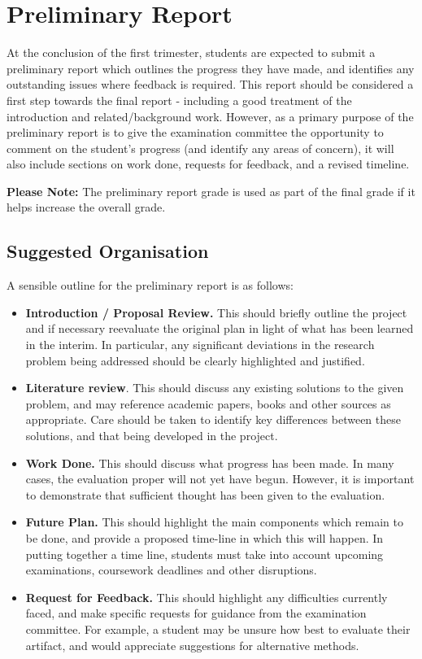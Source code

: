 \chapter{Preliminary Report}
At the conclusion of the first trimester, students are expected to
submit a preliminary report which outlines the progress they have made,
and identifies any outstanding issues where feedback is required. This
report should be considered a first step towards the final report -
including a good treatment of the introduction and related/background
work.  However, as a primary purpose of the preliminary report is to give the examination
committee the opportunity to comment on the student's progress (and
identify any areas of concern), it will also include sections on work
done, requests for feedback, and a revised timeline.

{\bf Please Note:} The preliminary report grade is used as part of the final grade 
if it helps increase the overall grade.

\section{Suggested Organisation}
A sensible outline for the preliminary report is as follows:
\begin{itemize}
\item {\bf Introduction / Proposal Review.}  This should briefly
  outline the project and if necessary reevaluate the original plan in light of
  what has been learned in the interim.  In particular, any significant
  deviations in the research problem being addressed
  should be clearly highlighted and justified.
\item {\bf Literature review}.  This should discuss any existing
  solutions to the given problem, and may reference academic papers,
  books and other sources as appropriate.  Care should be taken to
  identify key differences between these solutions, and that being
  developed in the project.
\item {\bf Work Done.}  This should discuss what progress has been
  made.  In many cases, the evaluation proper will not yet have begun.  However,
  it is important to demonstrate that sufficient thought has been
  given to the evaluation.
\item {\bf Future Plan.}  This should highlight the main components
  which remain to be done, and provide a proposed time-line in which
  this will happen.  In putting together a time line, students must
  take into account upcoming examinations, coursework deadlines and
  other disruptions.
\item {\bf Request for Feedback.}  This should highlight any
  difficulties currently faced, and make specific requests for
  guidance from the examination committee.  For example, a student may
  be unsure how best to evaluate their artifact, and would appreciate
  suggestions for alternative methods.
\end{itemize}

